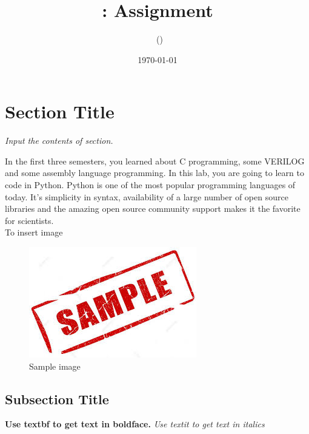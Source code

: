 \documentclass[11pt, a4paper, twoside]{article}
\title{\courseNumber : Assignment \assignmentNumber}
\author{\myName\ (\rollNumber)}
\date{\today}
\begin{document}
\maketitle

\section{Section Title}

 \textit{Input the contents of section.}
 
 In the first three semesters, you learned about C programming, some VERILOG and some assembly language programming. In this lab, you are going to learn to code in Python. Python is one of the most popular programming languages of today. It’s simplicity in syntax, availability of a large number of open source libraries and the amazing open source community support makes it the favorite for scientists. \\
To insert image 
   \begin{figure}[!tbh]
   	\centering
   	\includegraphics[scale=0.5]{images.jpeg}  %
   	\caption{Sample image}
   	\label{fig:sample}
   \end{figure} 
\subsection*{Subsection Title}
	
  \textbf{Use textbf to get text in boldface.}
  \textit{Use textit to get text in italics}
  
\end{document}
